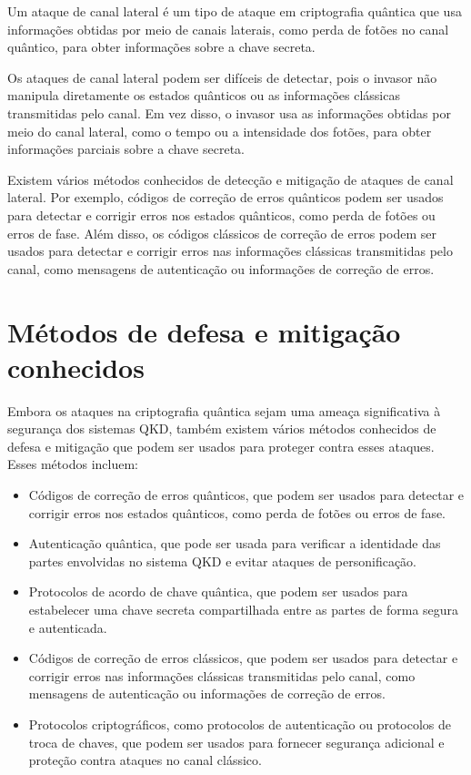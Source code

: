 Um ataque de canal lateral é um tipo de ataque em criptografia quântica que usa informações obtidas por meio de canais laterais, como perda de fotões no canal quântico, para obter informações sobre a chave secreta.

Os ataques de canal lateral podem ser difíceis de detectar, pois o invasor não manipula diretamente os estados quânticos ou as informações clássicas transmitidas pelo canal. Em vez disso, o invasor usa as informações obtidas por meio do canal lateral, como o tempo ou a intensidade dos fotões, para obter informações parciais sobre a chave secreta.

Existem vários métodos conhecidos de detecção e mitigação de ataques de canal lateral. Por exemplo, códigos de correção de erros quânticos podem ser usados para detectar e corrigir erros nos estados quânticos, como perda de fotões ou erros de fase. Além disso, os códigos clássicos de correção de erros podem ser usados para detectar e corrigir erros nas informações clássicas transmitidas pelo canal, como mensagens de autenticação ou informações de correção de erros.

\newpage

\section{Métodos de defesa e mitigação conhecidos}

Embora os ataques na criptografia quântica sejam uma ameaça significativa à segurança dos sistemas QKD, também existem vários métodos conhecidos de defesa e mitigação que podem ser usados para proteger contra esses ataques. Esses métodos incluem:

\begin{itemize}
  \item Códigos de correção de erros quânticos, que podem ser usados para detectar e corrigir erros nos estados quânticos, como perda de fotões ou erros de fase.
  \item Autenticação quântica, que pode ser usada para verificar a identidade das partes envolvidas no sistema QKD e evitar ataques de personificação.
  \item Protocolos de acordo de chave quântica, que podem ser usados para estabelecer uma chave secreta compartilhada entre as partes de forma segura e autenticada.
  \item Códigos de correção de erros clássicos, que podem ser usados para detectar e corrigir erros nas informações clássicas transmitidas pelo canal, como mensagens de autenticação ou informações de correção de erros.
  \item Protocolos criptográficos, como protocolos de autenticação ou protocolos de troca de chaves, que podem ser usados para fornecer segurança adicional e proteção contra ataques no canal clássico.
\end{itemize}

